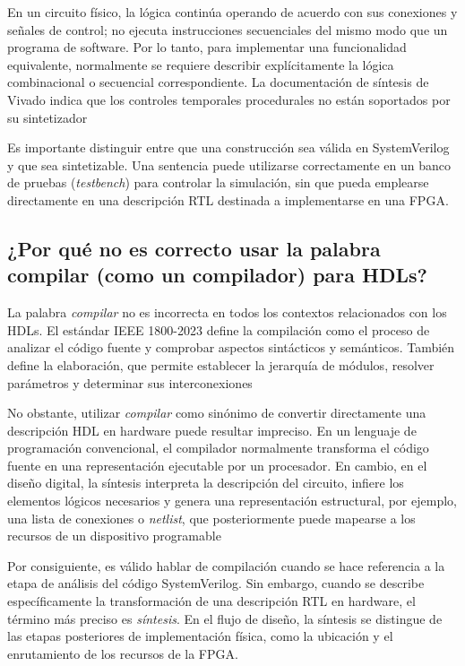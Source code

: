 \documentclass[12pt,letterpaper]{article}
\begin{document}
En un circuito físico, la lógica continúa operando de acuerdo
con sus conexiones y señales de control; no ejecuta instrucciones
secuenciales del mismo modo que un programa de software. Por lo
tanto, para implementar una funcionalidad equivalente, normalmente
se requiere describir explícitamente la lógica combinacional o
secuencial correspondiente. La documentación de síntesis de
Vivado indica que los controles temporales procedurales no están
soportados por su sintetizador
\cite{amd2026svconstructs}

Es importante distinguir entre que una construcción sea válida
en SystemVerilog y que sea sintetizable. Una sentencia puede
utilizarse correctamente en un banco de pruebas (\textit{testbench})
para controlar la simulación, sin que pueda emplearse directamente
en una descripción RTL destinada a implementarse en una FPGA.

\subsection{¿Por qué no es correcto usar la palabra compilar (como un compilador) para HDLs?}

La palabra \textit{compilar} no es incorrecta en todos los
contextos relacionados con los HDLs. El estándar IEEE 1800-2023
define la compilación como el proceso de analizar el código fuente
y comprobar aspectos sintácticos y semánticos. También define la
elaboración, que permite establecer la jerarquía de módulos,
resolver parámetros y determinar sus interconexiones
\cite{ieee2024systemverilog}

No obstante, utilizar \textit{compilar} como sinónimo de convertir
directamente una descripción HDL en hardware puede resultar
impreciso. En un lenguaje de programación convencional, el
compilador normalmente transforma el código fuente en una
representación ejecutable por un procesador. En cambio, en el
diseño digital, la síntesis interpreta la descripción del circuito,
infiere los elementos lógicos necesarios y genera una representación
estructural, por ejemplo, una lista de conexiones o
\textit{netlist}, que posteriormente puede mapearse a los recursos
de un dispositivo programable
\cite{amd2026synthesis}

Por consiguiente, es válido hablar de compilación cuando se hace
referencia a la etapa de análisis del código SystemVerilog. Sin
embargo, cuando se describe específicamente la transformación
de una descripción RTL en hardware, el término más preciso es
\textit{síntesis}. En el flujo de diseño, la síntesis se distingue
de las etapas posteriores de implementación física, como la
ubicación y el enrutamiento de los recursos de la FPGA.
\end{document}
